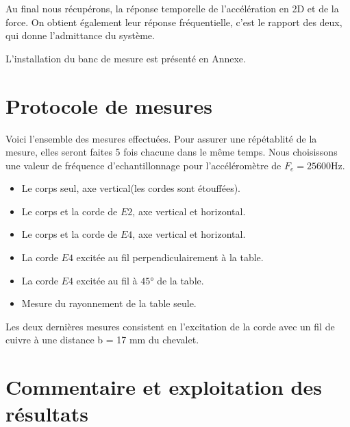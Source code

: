 Au final nous récupérons, la réponse temporelle de l'accélération en 2D et de la force. On obtient également leur réponse fréquentielle, c'est le rapport des deux, qui donne l'admittance du système.

L'installation du banc de mesure est présenté en Annexe. %


\section{Protocole de mesures}
Voici l'ensemble des mesures effectuées. Pour assurer une répétablité de la mesure, elles seront faites 5 fois chacune dans le même temps. Nous choisissons une valeur de fréquence d'echantillonnage pour l'accéléromètre de  $F_e = \si{25600\Hz}$.
\begin{itemize}
\item Le corps seul, axe vertical(les cordes sont étouffées).
\item Le corps et la corde de \( E2 \), axe vertical et horizontal.
\item Le corps et la corde de \( E4 \), axe vertical et horizontal.
\item La corde \( E4 \) excitée au fil perpendiculairement à la table.
\item La corde \( E4 \) excitée au fil à \( \si{45 \degree} \) de la table.
\item Mesure du rayonnement de la table seule.
\end{itemize}
Les deux dernières mesures consistent en l'excitation de la corde avec un fil de cuivre à une distance b = 17 mm du chevalet. 

\section{Commentaire et exploitation des résultats}
